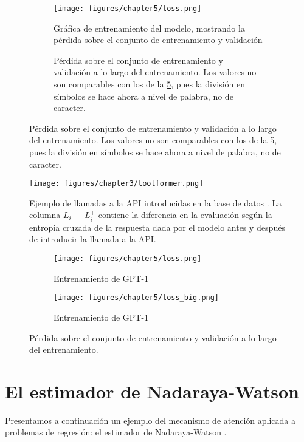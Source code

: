 \begin{figure}
    \centering
    \begin{subfigure}
        \centering
        \texttt{[image: figures/chapter5/loss.png]}
        \caption{Gráfica de entrenamiento del modelo, mostrando la pérdida sobre el conjunto de entrenamiento y validación}
        \label{fig:loss}
    \end{subfigure}
    \begin{subfigure}
        \texttt{[image: figures/chapter5/loss\_big.png]}
        \caption{Pérdida sobre el conjunto de entrenamiento y validación a lo largo del entrenamiento. Los valores no son comparables con los de la \cref{fig:loss}, pues la división en símbolos se hace ahora a nivel de palabra, no de caracter. }
        \label{fig:loss_big}
    \end{subfigure}
\end{figure}

\begin{figure}[tb]
    \centering
    \texttt{[image: figures/chapter3/toolformer.png]}
    \caption{Ejemplo de llamadas a la API introducidas en la base de datos \cite{schick2023toolformer}. La columna \(L_i^- - L_i^+ \) contiene la diferencia en la evaluación según la entropía cruzada de la respuesta dada por el modelo antes y después de introducir la llamada a la API. \cite{schick2023toolformer}}
    \label{fig:toolformer}
\end{figure}

\begin{figure}[tb]
    \centering
    \begin{subfigure}[b]{0.49\textwidth}
        \centering
        \texttt{[image: figures/chapter5/loss.png]}
        \caption{Entrenamiento de GPT-1}
        \label{fig:loss}
    \end{subfigure}
    \begin{subfigure}[b]{0.49\textwidth}
        \centering
        \texttt{[image: figures/chapter5/loss\_big.png]}
        \caption{Entrenamiento de GPT-1}
        \label{fig:loss_big}
    \end{subfigure}
    \caption{Pérdida sobre el conjunto de entrenamiento y validación a lo largo del entrenamiento.}
\end{figure}

\chapter{El estimador de Nadaraya-Watson}
Presentamos a continuación un ejemplo del mecanismo de atención aplicada a problemas de regresión: el estimador de Nadaraya-Watson \cite{watson1964smooth, nadaraya1964estimating}.

